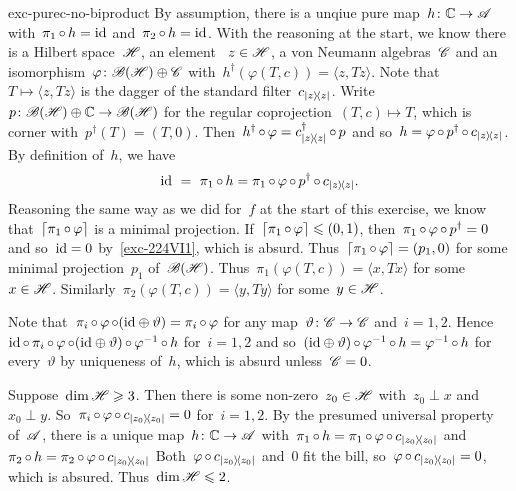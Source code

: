\begin{solution}{exc-purec-no-biproduct}
By assumption, there is a unqiue pure map~$h\colon \mathbb{C} \to \mathscr{A}$
    with~$\pi_1 \mathop{\circ} h = \mathrm{id}$ and~$\pi_2 \mathop{\circ} h = \mathrm{id}$.
With the reasoning at the start,
    we know there is a Hilbert space~$\mathscr{H}$, an element~ $z\in \mathscr{H}$,
    a von Neumann algebras~$\mathscr{C}$
    and an isomorphism~$\varphi\colon \mathscr{B}(\mathscr{H})\oplus \mathscr{C}$
    with~$h^\dagger (\varphi(T,c)) = \langle z, Tz \rangle$.
    Note that~$T \mapsto \langle z, T z\rangle$
        is the dagger of the standard filter~$c_{\left|z\right>\!\left<z\right|}$.
    Write~$p\colon \mathscr{B}(\mathscr{H}) \oplus \mathbb{C} \to \mathscr{B}(\mathscr{H})$
        for the regular coprojection~$(T,c) \mapsto T$,
        which is corner with~$p^\dagger(T) = (T,0)$.
        Then~$h^\dagger \mathop{\circ} \varphi = c^\dagger_{\left|z\right>\!\left<z\right|} \mathop{\circ} p$
            and so~$h = \varphi \mathop{\circ} p^\dagger \mathop{\circ} c_{\left|z\right>\!\left<z\right|}$.
    By definition of~$h$, we have 
\begin{equation}\label{exc-224VI1}
    \mathrm{id} \ =\ \pi_1 \mathop{\circ} h = \pi_1 \mathop{\circ} \varphi \mathop{\circ} p^\dagger \mathop{\circ} c_{\left|z\right>\!\left<z\right|}.
\end{equation}
Reasoning the same way as we did for~$f$ at the start
    of this exercise,
    we know that~$\left\lceil\pi_1 \mathop{\circ} \varphi\right\rceil$ is a minimal projection.
    If~$\left\lceil\pi_1 \mathop{\circ} \varphi\right\rceil \leqslant (0,1)$,
        then~$\pi_1 \mathop{\circ} \varphi \mathop{\circ} p^\dagger = 0$
        and so~$\mathrm{id} = 0$ by~\eqref{exc-224VI1}, which is absurd.
    Thus~$\left\lceil\pi_1 \mathop{\circ} \varphi\right\rceil = (p_1,0)$
    for some minimal projection~$p_1$ of~$\mathscr{B}(\mathscr{H})$.
Thus~$\pi_1 (\varphi(T,c)) = \langle x, T x\rangle$ for some~$x \in \mathscr{H}$.
Similarly~$\pi_2 (\varphi(T,c)) = \langle y, T y\rangle$ for some~$y \in \mathscr{H}$.

Note that~$
\pi_i \mathop{\circ} \varphi \mathop{\circ} (\mathrm{id} \oplus \vartheta)
=\pi_i \mathop{\circ} \varphi$
for any map~$\vartheta\colon \mathscr{C} \to \mathscr{C}$ and~$i=1,2$.
Hence~$\mathrm{id} \mathop{\circ} \pi_i \mathop{\circ} \varphi \mathop{\circ} (\mathrm{id} \oplus\vartheta) \mathop{\circ} \varphi^{-1} \mathop{\circ} h$
    for~$i=1,2$ and so~$(\mathrm{id}\oplus\vartheta) \mathop{\circ} \varphi^{-1}\mathop{\circ} h = \varphi^{-1}\mathop{\circ} h$
    for every~$\vartheta$ by uniqueness of~$h$,
    which is absurd unless~$\mathscr{C} = 0$.

Suppose~$\dim \mathscr{H} \geqslant 3$.
Then there is some non-zero~$z_0 \in \mathscr{H}$
    with~$z_0 \perp x$ and~$x_0 \perp y$.
So~$\pi_i \mathop{\circ} \varphi \mathop{\circ} c_{\left|z_0\right>\!\left<z_0\right|} = 0$ for~$i=1,2$.
By the presumed universal property of~$\mathscr{A}$,
    there is a unique map~$h\colon \mathbb{C} \to \mathscr{A}$
        with~$\pi_1 \mathop{\circ} h = \pi_1 \mathop{\circ} \varphi \mathop{\circ} c_{\left|z_0\right>\!\left<z_0\right|}$
        and~$\pi_2 \mathop{\circ} h = \pi_2 \mathop{\circ} \varphi \mathop{\circ} c_{\left|z_0\right>\!\left<z_0\right|}$
Both~$\varphi \mathop{\circ} c_{\left|z_0\right>\!\left<z_0\right|}$ and~$0$ fit the bill,
    so~$\varphi \mathop{\circ} c_{\left|z_0\right>\!\left<z_0\right|} = 0$,
    which is absured. Thus~$\dim \mathscr{H} \leqslant 2$.


\end{solution}
